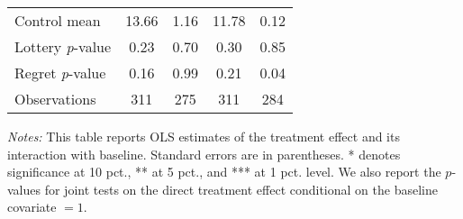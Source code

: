 \begin{table}[htbp]
{\begin{threeparttable}
\begin{tabular}{l*{4}{c}}
Control mean    &    13.66         &     1.16         &    11.78         &     0.12         \\
Lottery \emph{p}-value&     0.23         &     0.70         &     0.30         &     0.85         \\
Regret \emph{p}-value&     0.16         &     0.99         &     0.21         &     0.04         \\
Observations    &      311         &      275         &      311         &      284         \\
\bottomrule \end{tabular} \begin{tablenotes}[flushleft] \footnotesize \item \emph{Notes:} This table reports OLS estimates of the treatment effect and its interaction with baseline. Standard errors are in parentheses. * denotes significance at 10 pct., ** at 5 pct., and *** at 1 pct. level. We also report the \(p\)-values for joint tests on the direct treatment effect conditional on the baseline covariate $= 1$. \end{tablenotes} \end{threeparttable} } \end{table}
